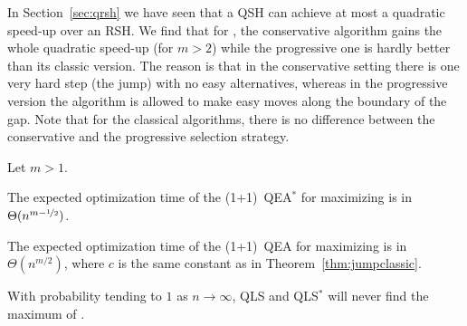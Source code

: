 In Section~\ref{sec:qrsh} we have seen that a QSH can achieve at most a quadratic speed-up over an RSH. We find that for \jumpm, the conservative algorithm gains the whole quadratic speed-up (for $m>2$) while the progressive one is hardly better than its classic version. The reason is that in the conservative setting there is one very hard step (the jump) with no easy alternatives, whereas in the progressive version the algorithm is allowed to make easy moves along the boundary of the gap. Note that for the classical algorithms, there is no difference between the conservative and the progressive selection strategy.

\begin{theorem}
Let $m > 1$.

The expected optimization time of the (1+1)~QEA$^*$ for maximizing \jumpm is in~$\Theta(n^{m-\nicefrac{1}{2}})$.

The expected optimization time of the (1+1)~QEA for maximizing \jumpm is in~$\Theta(n^{m/2})$, where $c$ is the same constant as in Theorem~\ref{thm:jumpclassic}.

With probability tending to $1$ as $n \to \infty$, QLS and QLS$^*$ will never find the maximum of \jumpm.
\end{theorem}


